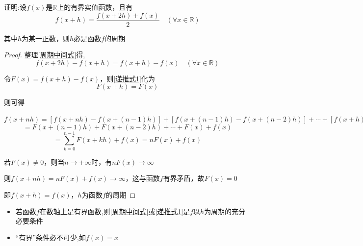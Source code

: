 \vspace{8pt}

\begin{example}
    证明:设$f(x)$是$\mathbb{R}$上的有界实值函数，且有
    \begin{equation}
        f(x+h)=\frac{f(x+2h)+f(x)}{2} \quad (\forall x\in \mathbb{R})   \label{周期中间式}
    \end{equation}

    其中$h$为某一正数，则$h$必是函数$f$的周期
\end{example}

\begin{proof}

    整理\cref{周期中间式}得,
    \begin{equation}
        f(x+2h)-f(x+h)=f(x+h)-f(x)\quad(\forall x\in \mathbb{R})    \label{递推式1}
    \end{equation}

    令$F(x)=f(x+h)-f(x)$，则\cref{递推式1}化为
    \begin{equation}
        F(x+h)=F(x)
    \end{equation}

    则可得

    $f(x+nh)=[f(x+nh)-f(x+(n-1)h)]+[f(x+(n-1)h)-f(x+(n-2)h)]+\cdots+[f(x+h)-f(x)]+f(x)$
    $$=F(x+(n-1)h)+F(x+(n-2)h)+\cdots+F(x)+f(x)$$
    \begin{equation*}
        =\sum_{k=0}^{n-1}F(x+kh)+f(x)=nF(x)+f(x)
    \end{equation*}

    若$F(x)\ne 0$，则当$n\to +\infty$时，有$nF(x)\to \infty$

    则$f(x+nh)=nF(x)+f(x)\to \infty$，这与函数$f$有界矛盾，故$F(x)=0$

    即$f(x+h)=f(x)$，$h$为函数$f$的周期
\end{proof}

\vspace{4pt}

\begin{note}
    \begin{itemize}
        \item 若函数$f$在数轴上是有界函数,则\cref{周期中间式}或\cref{递推式1}是$f$以$h$为周期的充分必要条件
        \item “有界”条件必不可少,如$f(x)=x$
    \end{itemize}
\end{note}

\vspace{6pt}


